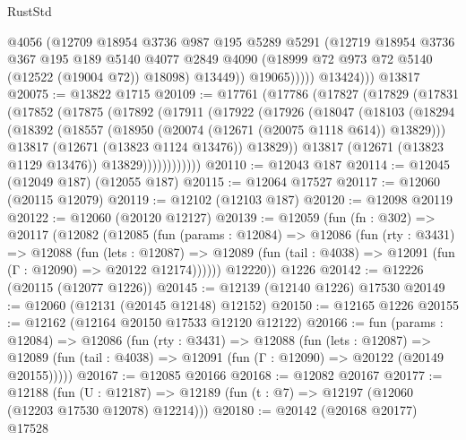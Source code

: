 \begin{lexlean}{RustStd}
\begin{coremodule}
                    @4056
                    (@12709
                      @18954
                      @3736
                      @987
                      @195
                      @5289
                      @5291
                      (@12719
                        @18954
                        @3736
                        @367
                        @195
                        @189
                        @5140
                        @4077
                        @2849
                        @4090
                        (@18999 @72 @973 @72 @5140 (@12522 (@19004 @72)) @18098)
                        @13449))
                    @19065)))))
          @13424)))
    @13817
@20075 := @13822 @1715
@20109 := @17761
    (@17786
      (@17827
        (@17829
          (@17831
            (@17852
              (@17875
                (@17892
                  (@17911
                    (@17922
                      (@17926
                        (@18047
                          (@18103
                            (@18294
                              (@18392
                                (@18557 (@18950 (@20074 (@12671 (@20075 @1118 @614)) @13829)))
                                @13817
                                (@12671 (@13823 @1124 @13476))
                                @13829))
                            @13817
                            (@12671 (@13823 @1129 @13476))
                            @13829))))))))))))
@20110 := @12043 @187
@20114 := @12045 (@12049 @187) (@12055 @187)
@20115 := @12064 @17527
@20117 := @12060 (@20115 @12079)
@20119 := @12102 (@12103 @187)
@20120 := @12098 @20119
@20122 := @12060 (@20120 @12127)
@20139 := @12059
    (fun (fn : @302) =>
    @20117
      (@12082
        (@12085
          (fun (params : @12084) =>
          @12086
            (fun (rty : @3431) =>
            @12088
              (fun (lets : @12087) =>
              @12089 (fun (tail : @4038) => @12091 (fun (Γ : @12090) => @20122 @12174))))))
        @12220))
    @1226
@20142 := @12226 (@20115 (@12077 @1226))
@20145 := @12139 (@12140 @1226) @17530
@20149 := @12060 (@12131 (@20145 @12148) @12152)
@20150 := @12165 @1226
@20155 := @12162 (@12164 @20150 @17533 @12120 @12122)
@20166 := fun (params : @12084) =>
  @12086
    (fun (rty : @3431) =>
    @12088
      (fun (lets : @12087) =>
      @12089 (fun (tail : @4038) => @12091 (fun (Γ : @12090) => @20122 (@20149 @20155)))))
@20167 := @12085 @20166
@20168 := @12082 @20167
@20177 := @12188
    (fun (U : @12187) => @12189 (fun (t : @7) => @12197 (@12060 (@12203 @17530 @12078) @12214)))
@20180 := @20142 (@20168 @20177) @17528

\end{coremodule}
\end{lexlean}
